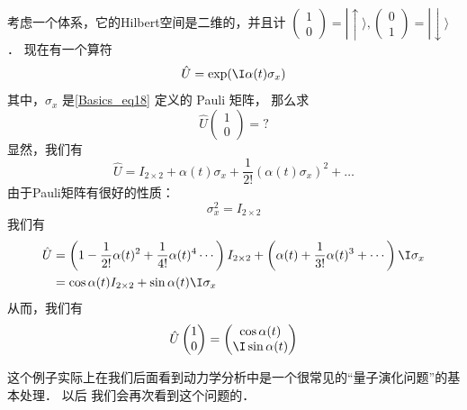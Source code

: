 \begin{exercise}{}
考虑一个体系，它的Hilbert空间是二维的，并且计 $\left(\begin{matrix}1 \\0\end{matrix}\right) = |\!\uparrow\rangle, \left(\begin{matrix}0 \\1\end{matrix}\right) = |\!\downarrow\rangle$． 现在有一个算符
\begin{equation}
\hat{U} = \exp(\I\alpha(t) \sigma_x)
\end{equation}
其中，$\sigma_x$ 是\autoref{Basics_eq18} 定义的 Pauli 矩阵， 那么求
\begin{equation}
\hat{U} \left(\begin{matrix}1 \\0\end{matrix}\right) = ? 
\end{equation}
显然，我们有
\begin{equation}
\hat U= I_{2\times2} + \alpha(t) \sigma_x + \frac{1}{2!}\left(\alpha(t) \sigma_x\right)^2 + \dots
\end{equation}
由于Pauli矩阵有很好的性质：
\begin{equation}
\sigma_x^2 = I_{2\times2}
\end{equation}
我们有
\begin{equation}
\begin{split}\hat U &= \left(1 - \frac{1}{2!}\alpha(t)^2 + \frac{1}{4!}\alpha(t)^4  \cdots\right)  I_{2\times2} + \left(\alpha(t) + \frac{1}{3!}\alpha(t)^3 + \cdots \right)\I \sigma_x\\
& = \cos\alpha(t) I_{2\times2} + \sin\alpha(t) \I\sigma_x 
\end{split}
\end{equation}
从而，我们有
\begin{equation}
\hat U \left(\begin{matrix}1 \\0\end{matrix}\right)  =  \left(\begin{matrix}\cos\alpha(t) \\ \I \sin\alpha(t)\end{matrix}\right)
\end{equation}

这个例子实际上在我们后面看到动力学分析中是一个很常见的``量子演化问题''的基本处理． 以后%
我们会再次看到这个问题的．
\end{exercise}

